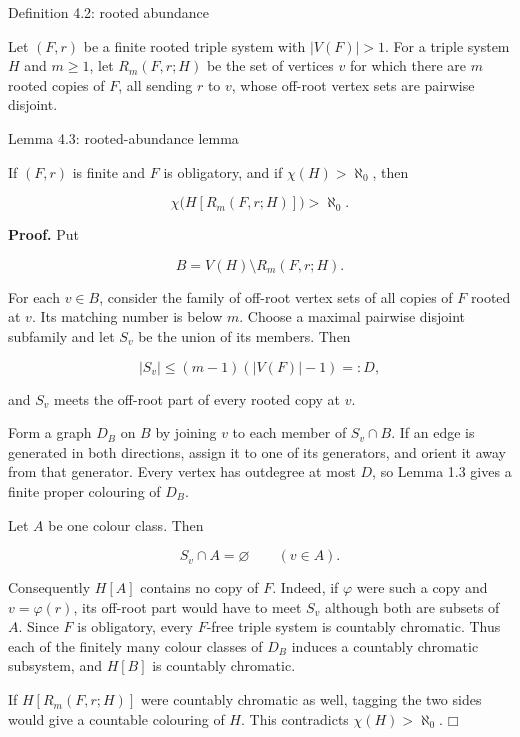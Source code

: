 \documentclass[11pt]{article}
\providecommand{\square}{\mdlgwhtsquare}
\begin{document}
\label{definition-4.2-rooted-abundance}
\begin{definitionbox}{Definition 4.2: rooted abundance}

Let \((F,r)\) be a finite rooted triple system with \(|V(F)|>1\). For a triple system \(H\) and \(m\ge1\), let \(R_m(F,r;H)\) be the set of vertices \(v\) for which there are \(m\) rooted copies of \(F\), all sending \(r\) to \(v\), whose off-root vertex sets are pairwise disjoint.

\end{definitionbox}
\label{lemma-4.3-rooted-abundance-lemma}
\begin{lemmabox}{Lemma 4.3: rooted-abundance lemma}

If \((F,r)\) is finite and \(F\) is obligatory, and if \(\chi(H)>\aleph_0\), then

\[
\chi\bigl(H[R_m(F,r;H)]\bigr)>\aleph_0.
\]

\end{lemmabox}
\textbf{Proof.} Put

\[
B=V(H)\setminus R_m(F,r;H).
\]

For each \(v\in B\), consider the family of off-root vertex sets of all copies of \(F\) rooted at \(v\). Its matching number is below \(m\). Choose a maximal pairwise disjoint subfamily and let \(S_v\) be the union of its members. Then

\[
|S_v|\le(m-1)(|V(F)|-1)=:D,
\]

and \(S_v\) meets the off-root part of every rooted copy at \(v\).

Form a graph \(D_B\) on \(B\) by joining \(v\) to each member of \(S_v\cap B\). If an edge is generated in both directions, assign it to one of its generators, and orient it away from that generator. Every vertex has outdegree at most \(D\), so Lemma 1.3 gives a finite proper colouring of \(D_B\).

Let \(A\) be one colour class. Then

\[
S_v\cap A=\varnothing\qquad(v\in A).
\]

Consequently \(H[A]\) contains no copy of \(F\). Indeed, if \(\varphi\) were such a copy and \(v=\varphi(r)\), its off-root part would have to meet \(S_v\) although both are subsets of \(A\). Since \(F\) is obligatory, every \(F\)-free triple system is countably chromatic. Thus each of the finitely many colour classes of \(D_B\) induces a countably chromatic subsystem, and \(H[B]\) is countably chromatic.

If \(H[R_m(F,r;H)]\) were countably chromatic as well, tagging the two sides would give a countable colouring of \(H\). This contradicts \(\chi(H)>\aleph_0\). \(\square\)
\end{document}
